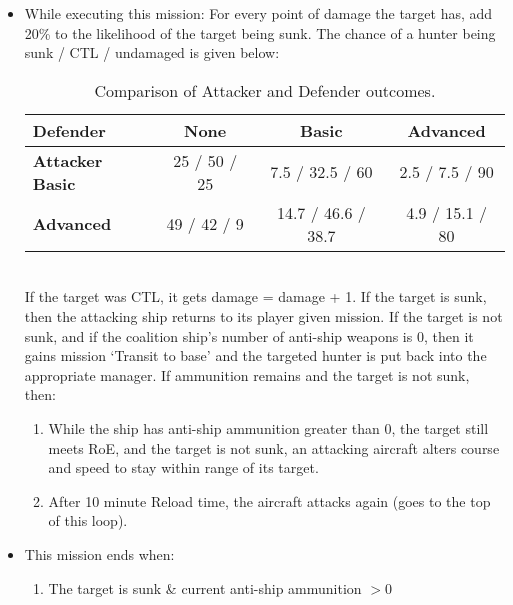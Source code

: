 \documentclass{article}
\begin{document}
\begin{itemize}
                \item{While executing this mission:}
                    For every point of damage the target has, add 20\% to the likelihood of the target being sunk. The chance of a hunter being sunk / CTL / undamaged is given below:\\
                    \begin{table}[h!]
                        \centering
                        \begin{tabular}{@{}lccc@{}}
                        \toprule
                        \textbf{Defender} & \textbf{None} & \textbf{Basic} & \textbf{Advanced} \\
                        \midrule
                        \textbf{Attacker} \textbf{Basic}    & 25 / 50 / 25    & 7.5 / 32.5 / 60     & 2.5 / 7.5 / 90     \\
                        \textbf{Advanced} & 49 / 42 / 9     & 14.7 / 46.6 / 38.7 & 4.9 / 15.1 / 80     \\
                        \bottomrule
                        \end{tabular}
                        \caption{Comparison of Attacker and Defender outcomes.}
                        \label{tab:Chance of a Coalition Ship hitting a Chinese ship}
                        \end{table}
                    \\If the target was CTL, it gets damage = damage + 1. If the target is sunk, then the attacking ship returns to its player given mission. If the target is not sunk, and if the coalition ship's number of anti-ship weapons is 0, then it gains mission `Transit to base' and the targeted hunter is put back into the appropriate manager. If ammunition remains and the target is not sunk, then:
                    \begin{enumerate}
                        \item While the ship has anti-ship ammunition greater than 0, the target still meets RoE, and the target is not sunk, an attacking aircraft alters course and speed to stay within range of its target.
                        \item After 10 minute Reload time, the aircraft attacks again (goes to the top of this loop).
                    \end{enumerate}
                \item{This mission ends when:} 
                \begin{enumerate}[label=\arabic*)]
                    \item The target is sunk \& current anti-ship ammunition $>0$ \par

\end{enumerate}
\end{itemize}
\end{document}
